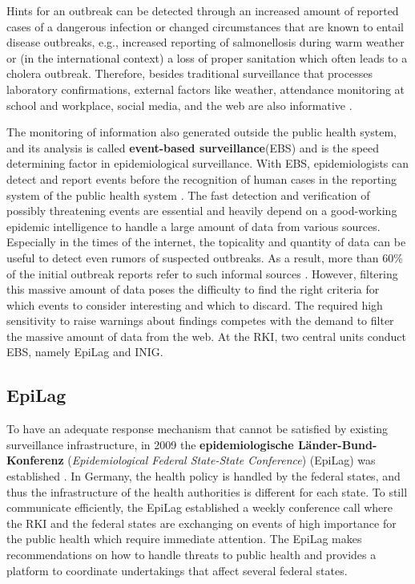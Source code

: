   Hints for an outbreak can be detected through an increased amount of reported cases of a dangerous infection or changed circumstances that are known to entail disease outbreaks, e.g., increased reporting of salmonellosis during warm weather or (in the international context) a loss of proper sanitation which often leads to a cholera outbreak.
  Therefore, besides traditional surveillance that processes laboratory confirmations, external factors like weather, attendance monitoring at school and workplace, social media, and the web are also informative \citep{EarlyDetection}.

  The monitoring of information also generated outside the public health system, and its analysis is called \textbf{event-based surveillance}(\gls{EBS}) and is the speed determining factor in epidemiological surveillance.
  With EBS, epidemiologists can detect and report events before the recognition of human cases in the reporting system of the public health system \citep{EarlyDetection}.
  The fast detection and verification of possibly threatening events are essential and heavily depend on a good-working epidemic intelligence to handle a large amount of data from various sources.
  Especially in the times of the internet, the topicality and quantity of data can be useful to detect even rumors of suspected outbreaks.
  As a result, more than 60\% of the initial outbreak reports refer to such informal sources \citep{EpiSurv}.
  However, filtering this massive amount of data poses the difficulty to find the right criteria for which events to consider interesting and which to discard.
  The required high sensitivity to raise warnings about findings competes with the demand to filter the massive amount of data from the web.
  At the RKI, two central units conduct EBS, namely EpiLag and INIG.

\subsection{EpiLag}
  To have an adequate response mechanism that cannot be satisfied by existing surveillance infrastructure, in 2009 the \textbf{epidemiologische L\"ander-Bund-Konferenz} (\textit{Epidemiological Federal State-State Conference}) (\gls{EpiLag}) was established \citep{Mohr2010}.
  In Germany, the health policy is handled by the federal states, and thus the infrastructure of the health authorities is different for each state.
  To still communicate efficiently, the EpiLag established a weekly conference call where the RKI and the federal states are exchanging on events of high importance for the public health which require immediate attention.
  The EpiLag makes recommendations on how to handle threats to public health and provides a platform to coordinate undertakings that affect several federal states.

